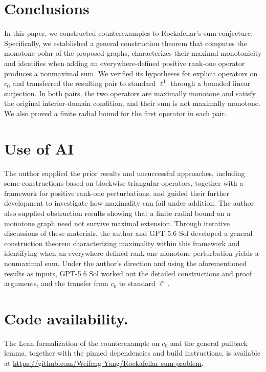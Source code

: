 \documentclass[11pt]{article}
\theoremstyle{definition}
\theoremstyle{remark}
\begin{document}
\section{Conclusions}
\label{sec:conclusion}

In this paper, we constructed counterexamples to Rockafellar's sum conjecture. Specifically, we established a general construction theorem that computes the monotone polar of the proposed graphs, characterizes their maximal monotonicity and identifies when adding an everywhere-defined positive rank-one operator produces a nonmaximal sum. We verified its hypotheses for explicit operators on $c_0$ and transferred the resulting pair to standard $\ell^1$ through a bounded linear surjection. In both pairs, the two operators are maximally monotone and satisfy the original interior-domain condition, and their sum is not maximally monotone. We also proved a finite radial bound for the first operator in each pair.


\section*{Use of AI}
The author supplied the prior results and unsuccessful approaches, including some constructions based on blockwise triangular operators, together with a framework for positive rank-one perturbations, and guided their further development to investigate how maximality can fail under addition. The author also supplied obstruction results showing that a finite radial bound on a monotone graph need not survive maximal extension. Through iterative discussions of these materials, the author and GPT-5.6 Sol developed a general construction theorem characterizing maximality within this framework and identifying when an everywhere-defined rank-one monotone perturbation yields a nonmaximal sum.  Under the author's direction and using the aforementioned results as inputs, GPT-5.6 Sol worked out the detailed constructions and proof arguments, and the transfer from $c_0$ to standard $\ell^1$. 

\section*{Code availability.}
The Lean formalization of the counterexample on $c_0$ and the general pullback lemma, together with the pinned dependencies and build instructions, is available at \url{https://github.com/Weifeng-Yang/Rockafellar-sum-problem}. 



\begingroup
\raggedright 

\endgroup
\end{document}
